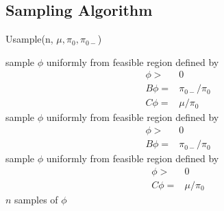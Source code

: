 \documentclass[11 pt, a4paper]{article}  %
\begin{document}

\newpage

\subsection{Sampling Algorithm}
\begin{algorithm}[H]
\caption{Usample(n, $\mu, \pi_0, \pi_{0-}$)}
\begin{algorithmic}[1]
\State sample $\phi$ uniformly from feasible region defined by 
\begin{align*}
\phi > & 0\\
B \phi = & \pi_{0-}/\pi_0\\ 
C \phi = & \mu/\pi_0
\end{align*}
\State sample $\phi$ uniformly from feasible region defined by 
\begin{align*}
\phi > & 0\\
B \phi = & \pi_{0-}/\pi_0
\end{align*}
\Else
\State sample $\phi$ uniformly from feasible region defined by 
\begin{align*}
\phi > & 0\\
C \phi = & \mu/\pi_0
\end{align*}
\EndIf
{} $n$ samples of $\phi$
\end{algorithmic}
\end{algorithm}
\end{document}
